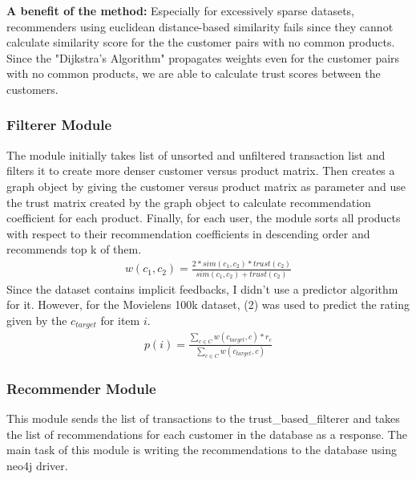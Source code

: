 	\textbf{A benefit of the method:} Especially for excessively sparse datasets, recommenders using euclidean distance-based similarity fails since they cannot calculate similarity score for the the customer pairs with no common products.	Since the  "Dijkstra's Algorithm" propagates weights even for the customer pairs with no common products, we are able to calculate trust scores between the customers.
	
	\subsubsection{Filterer Module} The module initially takes list of unsorted and unfiltered transaction list and filters it to create more denser customer versus product matrix. Then creates a graph object by giving the customer versus product matrix as parameter and use the trust matrix created by the graph object to calculate recommendation coefficient for each product. Finally, for each user, the module sorts all products with respect to their recommendation coefficients in descending order and recommends top k of them.
	\begin{equation} 
	\begin{split}
	w(c_{1}, c_{2}) = \frac{2*sim(c_{1},c_{2})*trust(c_{2})}{sim(c_{1},c_{2})+trust(c_{2})}
	\end{split}
	\end{equation}
	Since the dataset contains implicit feedbacks, I didn't use a predictor algorithm for it. However, for the Movielens 100k dataset\cite{Movielens}, (2) was used to predict the rating given by the $c_{target}$ for item $i$.
	\begin{equation} 
	\begin{split}
	p(i) = \frac{\sum_{c \in C}^{} w(c_{target}, c)*r_{c}}{\sum_{c \in C}^{} w(c_{target}, c)}
	\end{split}
	\end{equation}
	\subsubsection{Recommender Module} This module sends the list of transactions to the trust\_based\_filterer and takes the list of recommendations for each customer in the database as a response. The main task of this module is writing the recommendations to the database using neo4j driver.